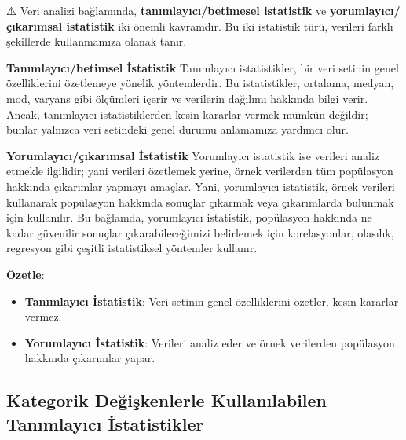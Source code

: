 \documentclass[
  letterpaper,
  DIV=11,
  numbers=noendperiod]{scrartcl}
\providecommand{\tightlist}{%
  \setlength{\itemsep}{0pt}\setlength{\parskip}{0pt}}\usepackage{longtable,booktabs,array}
\begin{document}
\begin{tcolorbox}[enhanced jigsaw, bottomrule=.15mm, opacitybacktitle=0.6, rightrule=.15mm, left=2mm, toprule=.15mm, leftrule=.75mm, titlerule=0mm, colframe=quarto-callout-note-color-frame, opacityback=0, arc=.35mm, colbacktitle=quarto-callout-note-color!10!white, title=\textcolor{quarto-callout-note-color}{\faInfo}\hspace{0.5em}{Not}, coltitle=black, breakable, bottomtitle=1mm, toptitle=1mm, colback=white]

⚠️ Veri analizi bağlamında, \textbf{tanımlayıcı/betimesel istatistik} ve
\textbf{yorumlayıcı/çıkarımsal istatistik} iki önemli kavramdır. Bu iki
istatistik türü, verileri farklı şekillerde kullanmamıza olanak tanır.

\textbf{Tanımlayıcı/betimsel İstatistik} Tanımlayıcı istatistikler, bir
veri setinin genel özelliklerini özetlemeye yönelik yöntemlerdir. Bu
istatistikler, ortalama, medyan, mod, varyans gibi ölçümleri içerir ve
verilerin dağılımı hakkında bilgi verir. Ancak, tanımlayıcı
istatistiklerden kesin kararlar vermek mümkün değildir; bunlar yalnızca
veri setindeki genel durumu anlamamıza yardımcı olur.

\textbf{Yorumlayıcı/çıkarımsal İstatistik} Yorumlayıcı istatistik ise
verileri analiz etmekle ilgilidir; yani verileri özetlemek yerine, örnek
verilerden tüm popülasyon hakkında çıkarımlar yapmayı amaçlar. Yani,
yorumlayıcı istatistik, örnek verileri kullanarak popülasyon hakkında
sonuçlar çıkarmak veya çıkarımlarda bulunmak için kullanılır. Bu
bağlamda, yorumlayıcı istatistik, popülasyon hakkında ne kadar güvenilir
sonuçlar çıkarabileceğimizi belirlemek için korelasyonlar, olasılık,
regresyon gibi çeşitli istatistiksel yöntemler kullanır.

\textbf{Özetle}:

\begin{itemize}
\tightlist
\item
  \textbf{Tanımlayıcı İstatistik}: Veri setinin genel özelliklerini
  özetler, kesin kararlar vermez.
\item
  \textbf{Yorumlayıcı İstatistik}: Verileri analiz eder ve örnek
  verilerden popülasyon hakkında çıkarımlar yapar.
\end{itemize}

\end{tcolorbox}

\hypertarget{kategorik-deux11fiux15fkenlerle-kullanux131labilen-tanux131mlayux131cux131-istatistikler}{%
\subsection{Kategorik Değişkenlerle Kullanılabilen Tanımlayıcı
İstatistikler}\label{kategorik-deux11fiux15fkenlerle-kullanux131labilen-tanux131mlayux131cux131-istatistikler}}
\end{document}
